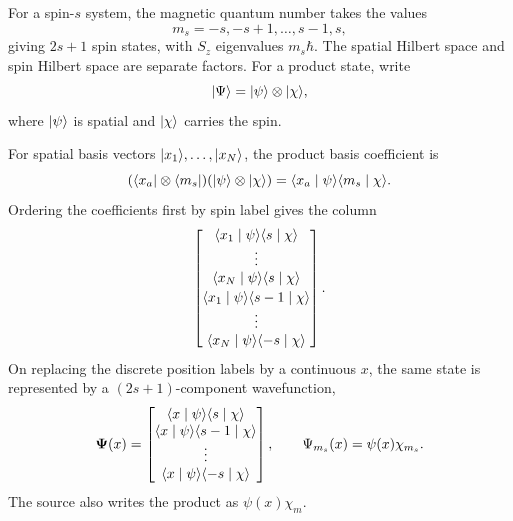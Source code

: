 For a spin-$s$ system, the magnetic quantum number takes the values
\[
 m_s=-s,-s+1,\ldots,s-1,s,
\]
giving $2s+1$ spin states, with $S_z$ eigenvalues $m_s\hbar$.
The spatial Hilbert space and spin Hilbert space are separate factors.
For a product state, write
\[
 \lvert \Psi\rangle=\lvert \psi\rangle\otimes\lvert \chi\rangle,
\]
where $\lvert \psi\rangle$ is spatial and $\lvert \chi\rangle$ carries the spin.

For spatial basis vectors $\lvert x_1\rangle,\ldots,\lvert x_N\rangle$, the product
basis coefficient is
\[
 (\langle x_a\rvert\otimes\langle m_s\rvert)(\lvert \psi\rangle\otimes\lvert \chi\rangle)
 =\langle x_a\mid \psi\rangle\langle m_s\mid \chi\rangle.
\]
Ordering the coefficients first by spin label gives the column
\[
 \begin{bmatrix}
  \langle x_1\mid \psi\rangle\langle s\mid \chi\rangle\\
  \vdots\\
  \langle x_N\mid \psi\rangle\langle s\mid \chi\rangle\\[2pt]
  \langle x_1\mid \psi\rangle\langle s-1\mid \chi\rangle\\
  \vdots\\
  \langle x_N\mid \psi\rangle\langle -s\mid \chi\rangle
 \end{bmatrix}.
\]
On replacing the discrete position labels by a continuous $x$, the
same state is represented by a $(2s+1)$-component wavefunction,
\[
 \boldsymbol\Psi(x)=
 \begin{bmatrix}
  \langle x\mid \psi\rangle\langle s\mid \chi\rangle\\
  \langle x\mid \psi\rangle\langle s-1\mid \chi\rangle\\
  \vdots\\
  \langle x\mid \psi\rangle\langle -s\mid \chi\rangle
 \end{bmatrix},\qquad
 \Psi_{m_s}(x)=\psi(x)\chi_{m_s}.
\]
The source also writes the product as $\psi(x)\chi_m$.
